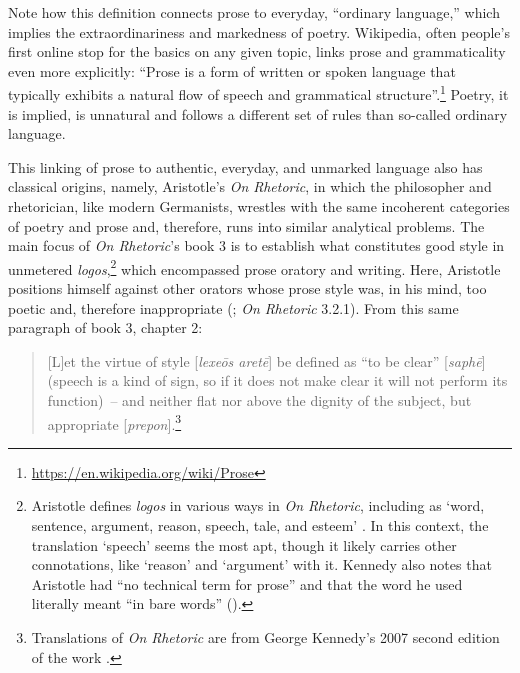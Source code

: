 \noindent Note how this definition connects prose to everyday, “ordinary language,” which implies the extraordinariness and markedness of poetry. Wikipedia, often people’s first online stop for the basics on any given topic, links prose and grammaticality even more explicitly: “Prose is a form of written or spoken language that typically exhibits a natural flow of speech and grammatical structure”.\footnote{\url{https://en.wikipedia.org/wiki/Prose}} Poetry, it is implied, is unnatural and follows a different set of rules than so-called ordinary language.

This linking of prose to authentic, everyday, and unmarked language also has classical origins, namely, Aristotle’s \textit{On Rhetoric}, in which the philosopher and rhetorician, like modern Germanists, wrestles with the same incoherent categories of poetry and prose and, therefore, runs into similar analytical problems. The main focus of \textit{On Rhetoric}’s book 3 is to establish what constitutes good style in unmetered \textit{logos},\footnote{{Aristotle defines} {\textit{logos}} {in various ways in} {\textit{On Rhetoric}}{, including as ‘word, sentence, argument, reason, speech, tale, and esteem’ \citep[317]{Kennedy2007}. In this context, the translation ‘speech’ seems the most apt, though it likely carries other connotations, like ‘reason’ and ‘argument’ with it. Kennedy also notes that Aristotle had “no technical term for prose” and that the word he used literally meant “in bare words” (\citealt[page 198, fn. 17]{Kennedy2007}).} } which encompassed prose oratory and writing. Here, Aristotle positions himself against other orators whose prose style was, in his mind, too poetic and, therefore inappropriate (\citealt[308]{Graff2005}; \textit{On Rhetoric} 3.2.1). From this same paragraph of book 3, chapter 2:

\begin{quote}{}
[L]et the virtue of style [\textit{lexeōs aretē}] be defined as “to be clear” [\textit{saphē}] (speech is a kind of sign, so if it does not make clear it will not perform its function)~-- and neither flat nor above the dignity of the subject, but appropriate [\textit{prepon}].\footnote{{Translations of} {\textit{On Rhetoric}} {are from George Kennedy’s 2007 second edition of the work \citep{Kennedy2007}.} }
\end{quote}

